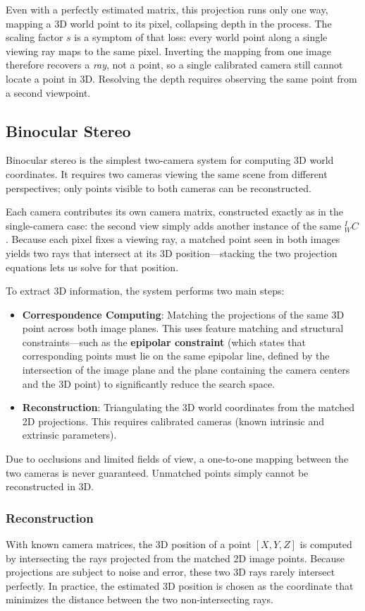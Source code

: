 Even with a perfectly estimated matrix, this projection runs only one way, mapping a 3D world point to its pixel, collapsing depth in the process.
The scaling factor $s$ is a symptom of that loss: every world point along a single viewing ray maps to the same pixel.
Inverting the mapping from one image therefore recovers a \emph{ray}, not a point, so a single calibrated camera still cannot locate a point in 3D.
Resolving the depth requires observing the same point from a second viewpoint.

\subsection{Binocular Stereo}
Binocular stereo is the simplest two-camera system for computing 3D world coordinates. 
It requires two cameras viewing the same scene from different perspectives; 
only points visible to both cameras can be reconstructed.

Each camera contributes its own camera matrix, constructed exactly as in the single-camera case: 
the second view simply adds another instance of the same $^I_WC$.
Because each pixel fixes a viewing ray, a matched point seen in both images yields two rays that intersect 
at its 3D position—stacking the two projection equations lets us solve for that position.

To extract 3D information, the system performs two main steps:
\begin{itemize}
    \item \textbf{Correspondence Computing}: Matching the projections of the same 3D point across both image planes. 
    This uses feature matching and structural constraints—such as the \textbf{epipolar constraint} 
    (which states that corresponding points must lie on the same epipolar line, defined by the intersection of the image plane and the plane containing the camera centers and the 3D point) to significantly reduce the search space.
    \item \textbf{Reconstruction}: Triangulating the 3D world coordinates from the matched 2D projections. 
    This requires calibrated cameras (known intrinsic and extrinsic parameters). 
\end{itemize}

Due to occlusions and limited fields of view, a one-to-one mapping between the two cameras is never guaranteed. 
Unmatched points simply cannot be reconstructed in 3D.

\subsubsection{Reconstruction}
With known camera matrices, the 3D position of a point $[X, Y, Z]$ is computed by 
intersecting the rays projected from the matched 2D image points. Because projections are subject to noise and error, 
these two 3D rays rarely intersect perfectly. In practice, the estimated 3D position 
is chosen as the coordinate that minimizes the distance between the two non-intersecting rays.

